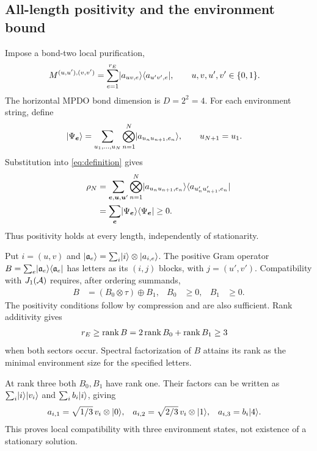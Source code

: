\documentclass[aps,pra,reprint,nofootinbib,onecolumn]{revtex4-2}
\begin{document}
\subsection{All-length positivity and the environment bound}

Impose a bond-two local purification,
\begin{align}
	M^{(u,u'),(v,v')}
	 & =\sum_{e=1}^{r_E}
	\lvert a_{uv,e}\rangle\langle a_{u'v',e}\rvert,
	\qquad u,v,u',v'\in\{0,1\}.
	\label{eq:purification}
\end{align}
The horizontal MPDO bond dimension is $D=2^2=4$. For each environment
string, define
\begin{align}
	\lvert\Psi_{\boldsymbol e}\rangle
	 & =\sum_{u_1,\ldots,u_N}
	\bigotimes_{n=1}^{N}\lvert a_{u_nu_{n+1},e_n}\rangle,
	\qquad u_{N+1}=u_1.
\end{align}
Substitution into \cref{eq:definition} gives
\begin{align}
	\rho_N
	 & =\sum_{\boldsymbol e,\boldsymbol u,\boldsymbol u'}
	\bigotimes_{n=1}^{N}
	\lvert a_{u_nu_{n+1},e_n}\rangle
	\langle a_{u'_nu'_{n+1},e_n}\rvert
	\nonumber                                             \\
	 & =\sum_{\boldsymbol e}
	\lvert\Psi_{\boldsymbol e}\rangle\langle\Psi_{\boldsymbol e}\rvert\geq0.
	\label{eq:all-positive}
\end{align}
Thus positivity holds at every length, independently of stationarity.

Put $i=(u,v)$ and
$\lvert\mathfrak a_e\rangle=\sum_i\lvert i\rangle\otimes\lvert a_{i,e}\rangle$.
The positive Gram operator
$B=\sum_e\lvert\mathfrak a_e\rangle\langle\mathfrak a_e\rvert$ has letters
as its $(i,j)$ blocks, with $j=(u',v')$.
Compatibility with $J_1(\mathcal{A})$ requires, after ordering summands,
\begin{align}
	B & =(B_0\otimes\tau)\oplus B_1, & B_0 & \geq0, & B_1 & \geq0.
	\label{eq:Gram}
\end{align}
The positivity conditions follow by compression and are also sufficient.
Rank additivity gives
\begin{align}
	r_E\geq\operatorname{rank} B
	 & =2\operatorname{rank} B_0+\operatorname{rank} B_1\geq3
	\label{eq:env-bound}
\end{align}
when both sectors occur. Spectral factorization of $B$ attains its rank
as the minimal environment size for the specified letters.

At rank three both $B_0,B_1$ have rank one. Their factors can be written
as $\sum_i\lvert i\rangle\lvert v_i\rangle$ and $\sum_i b_i\lvert i\rangle$, giving
\begin{align}
	a_{i,1} & =\sqrt{1/3}\,v_i\otimes\lvert0\rangle, &
	a_{i,2} & =\sqrt{2/3}\,v_i\otimes\lvert1\rangle, &
	a_{i,3} & =b_i\lvert4\rangle.
	\label{eq:rank-three}
\end{align}
This proves local compatibility with three environment states,
not existence of a stationary solution.
\end{document}
